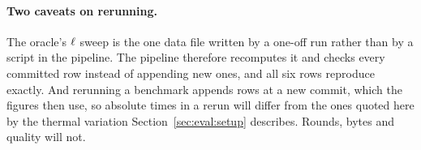 \paragraph{Two caveats on rerunning.} The oracle's $\ell$ sweep is the one data
file written by a one-off run rather than by a script in the pipeline. The
pipeline therefore recomputes it and checks every committed row instead of
appending new ones, and all six rows reproduce exactly. And rerunning a
benchmark appends rows at a new commit, which the figures then use, so absolute
times in a rerun will differ from the ones quoted here by the thermal variation
Section~\ref{sec:eval:setup} describes. Rounds, bytes and quality will not.
